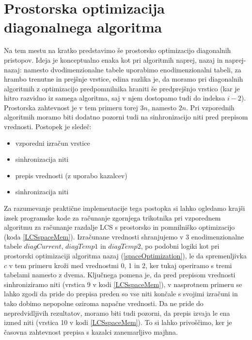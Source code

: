 \documentclass[a4paper,12pt,openright]{book}
\begin{document}
\section{Prostorska optimizacija diagonalnega algoritma}

Na tem mestu na kratko predstavimo še prostorsko optimizacijo diagonalnih pristopov. Ideja je konceptualno enaka kot pri algoritmih naprej, nazaj in naprej-nazaj: namesto dvodimenzionalne tabele uporabimo enodimenzionalni tabeli, za hrambo trenutne in prejšnje vrstice, edina razlika je, da moramo pri diagonalnih algoritmih z optimizacijo predpomnilnika hraniti še predprejšnjo vrstico (kar je hitro razvidno iz samega algoritma, saj v njem dostopamo tudi do indeksa $i-2$). Prostorska zahtevnost je v tem primeru torej $3n$, namesto $2n$. Pri vzporednih algoritmih moramo biti dodatno pozorni tudi na sinhronizacijo niti pred prepisom vrednosti. Postopek je sledeč:
\begin{itemize}
\item vzporedni izračun vrstice
\item sinhronizacija niti
\item prepis vrednosti (z uporabo kazalcev)
\item sinhronizacija niti
\end{itemize}

Za razumevanje praktične implementacije tega postopka si lahko ogledamo krajši izsek programske kode za računanje zgornjega trikotnika pri vzporednem algoritmu za računanje razdalje LCS s prostorsko in pomnilniško optimizacijo (koda \ref{LCSspaceMem}). Izračunane vrednosti shranjujemo v 3 enodimenzionalne tabele $diagCurrent$, $diagTemp1$ in $diagTemp2$, po podobni logiki kot pri prostorski optimizaciji algoritma nazaj (\ref{spaceOptimization}), le da spremenljivka $c$ v tem primeru kroži med vrednostmi 0, 1 in 2, ker tukaj operiramo s tremi tabelami namesto z dvema. Ključnega pomena je, da pred prepisom vrednosti sinhroniziramo niti (vrstica 9 v kodi \ref{LCSspaceMem}), v nasprotnem primeru se lahko zgodi da pride do prepisa preden so vse niti končale s svojimi izračuni in tako dobimo nepopolne oziroma napačne vrednosti. Da ne pride do nepredvidljivih rezultatov, moramo biti tudi pozorni, da prepis izvaja le ena izmed niti (vrstica 10 v kodi \ref{LCSspaceMem}). To si lahko privoščimo, ker je časovna zahtevnost prepisa s kazalci zanemarljivo majhna. 
\end{document}
